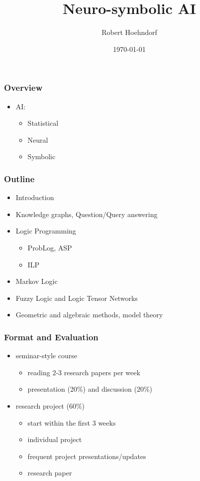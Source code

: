 \documentclass{beamer}
\title{Neuro-symbolic AI}
\author{Robert Hoehndorf}
\date{\today}
\begin{document}
\frame{\titlepage}

\begin{frame}
\frametitle{Overview}
\begin{itemize}
\item AI:
  \begin{itemize}
  \item Statistical
  \item Neural
  \item Symbolic
  \end{itemize}
\end{itemize}
\end{frame}

\begin{frame}
  \frametitle{Outline}
  \begin{itemize}
  \item Introduction
  \item Knowledge graphs, Question/Query answering
  \item Logic Programming
    \begin{itemize}
    \item ProbLog, ASP
    \item ILP
    \end{itemize}
  \item Markov Logic
  \item Fuzzy Logic and Logic Tensor Networks
  \item Geometric and algebraic methods, model theory
  \end{itemize}
\end{frame}

\begin{frame}
  \frametitle{Format and Evaluation}
  \begin{itemize}
  \item seminar-style course
    \begin{itemize}
    \item reading 2-3 research papers per week
    \item presentation (20\%) and discussion (20\%)
    \end{itemize}
  \item research project (60\%)
    \begin{itemize}
    \item start within the first 3 weeks
    \item individual project
    \item frequent project presentations/updates
    \item research paper
    \end{itemize}
  \end{itemize}
\end{frame}
\end{document}
